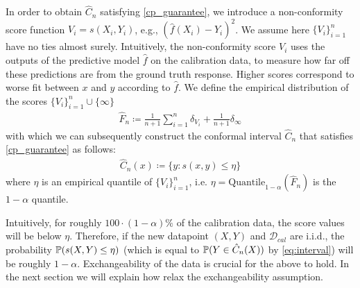 
In order to obtain $\hat{C}_n$ satisfying \eqref{cp_guarantee}, we introduce a non-conformity score function $V_i = s(X_i, Y_i)$, e.g., $(\hat{f}(X_i) - Y_i)^2$. We assume here $\{V_i\}_{i=1}^n$ have no ties almost surely. Intuitively, the non-conformity score $V_i$ uses the outputs of the predictive model $\hat{f}$ on the calibration data, to measure how far off these predictions are from the ground truth response. Higher scores correspond to worse fit between $x$ and $y$ according to $\hat{f}$. We define the empirical distribution of the scores $\{V_i\}_{i=1}^n \cup \{\infty\}$
\begin{align}\label{eq:std_emp_score}
 \hat{F}_{n} \coloneqq \frac{1}{n+1} \sum_{i=1}^n \delta_{V_i} + \frac{1}{n+1}\delta_{\infty}  
\end{align}
with which we can subsequently construct the conformal interval $\hat{C}_n$ that satisfies \eqref{cp_guarantee} as follows:
\begin{align}
    \hat{C}_n(x) \coloneqq \{y: s(x,y) \leq \eta\} \label{eq:interval}
\end{align}
where $\eta$ is an empirical quantile of $\{V_i\}_{i=1}^n$, i.e. $\eta = \text{Quantile}_{1-\alpha}(\hat{F}_{n})$ is the $1-\alpha$ quantile.

Intuitively, for roughly $100\cdot(1-\alpha) \%$ of the calibration data, the score values will be below $\eta$. Therefore, if the new datapoint $(X, Y)$ and $\mathcal{D}_{cal}$ are i.i.d., the probability $\mathbb{P}(s(X,Y) \leq \eta)$ (which is equal to $\mathbb{P}(Y \in \hat{C}_n(X))$ by \eqref{eq:interval}) will be roughly $1-\alpha$. Exchangeability of the data is crucial for the above to hold. In the next section we will explain how \cite{tibshirani2020conformal} relax the exchangeability assumption.

